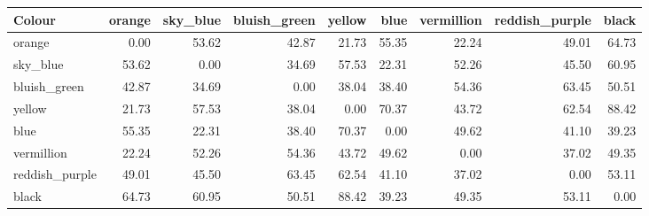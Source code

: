 \begin{tabular}{lrrrrrrrr}
\toprule
Colour & orange & sky\_blue & bluish\_green & yellow & blue & vermillion & reddish\_purple & black \\
\midrule
orange & 0.00 & 53.62 & 42.87 & 21.73 & 55.35 & 22.24 & 49.01 & 64.73 \\
sky\_blue & 53.62 & 0.00 & 34.69 & 57.53 & 22.31 & 52.26 & 45.50 & 60.95 \\
bluish\_green & 42.87 & 34.69 & 0.00 & 38.04 & 38.40 & 54.36 & 63.45 & 50.51 \\
yellow & 21.73 & 57.53 & 38.04 & 0.00 & 70.37 & 43.72 & 62.54 & 88.42 \\
blue & 55.35 & 22.31 & 38.40 & 70.37 & 0.00 & 49.62 & 41.10 & 39.23 \\
vermillion & 22.24 & 52.26 & 54.36 & 43.72 & 49.62 & 0.00 & 37.02 & 49.35 \\
reddish\_purple & 49.01 & 45.50 & 63.45 & 62.54 & 41.10 & 37.02 & 0.00 & 53.11 \\
black & 64.73 & 60.95 & 50.51 & 88.42 & 39.23 & 49.35 & 53.11 & 0.00 \\
\bottomrule
\end{tabular}

